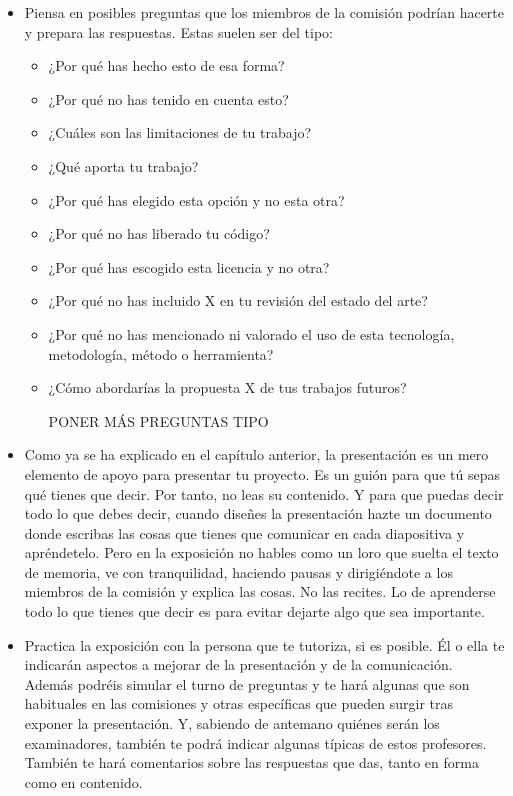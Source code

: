 \begin{itemize}
    \item Piensa en posibles preguntas que los miembros de la comisión podrían hacerte y prepara las respuestas. Estas suelen ser del tipo:

    \begin{itemize}
        \item ¿Por qué has hecho esto de esa forma?
        \item ¿Por qué no has tenido en cuenta esto?
        \item ¿Cuáles son las limitaciones de tu trabajo?
        \item ¿Qué aporta tu trabajo?
        \item ¿Por qué has elegido esta opción y no esta otra?
        \item ¿Por qué no has liberado tu código? 
        \item ¿Por qué has escogido esta licencia y no otra?
        \item ¿Por qué no has incluido X en tu revisión del estado del arte?
        \item ¿Por qué no has mencionado ni valorado el uso de esta tecnología, metodología, método o herramienta?
        \item ¿Cómo abordarías la propuesta X de tus trabajos futuros? 
        \item [PONER MÁS PREGUNTAS TIPO]
    \end{itemize}

    \item Como ya se ha explicado en el capítulo anterior, la presentación es un mero elemento de apoyo para presentar tu proyecto. Es un guión para que tú sepas qué tienes que decir. Por tanto, no leas su contenido. Y para que puedas decir todo lo que debes decir, cuando diseñes la presentación hazte un documento donde escribas las cosas que tienes que comunicar en cada diapositiva y apréndetelo. Pero en la exposición no hables como un loro que suelta el texto de memoria, ve con tranquilidad, haciendo pausas y dirigiéndote a los miembros de la comisión y explica las cosas. No las recites. Lo de aprenderse todo lo que tienes que decir es para evitar dejarte algo que sea importante. 

    \item Practica la exposición con la persona que te tutoriza, si es posible. Él o ella te indicarán aspectos a mejorar de la presentación y de la comunicación. Además podréis simular el turno de preguntas y te hará algunas que son habituales en las comisiones y otras específicas que pueden surgir tras exponer la presentación. Y, sabiendo de antemano quiénes serán los examinadores, también te podrá indicar algunas típicas de estos profesores. También te hará comentarios sobre las respuestas que das, tanto en forma como en contenido.


\end{itemize}
